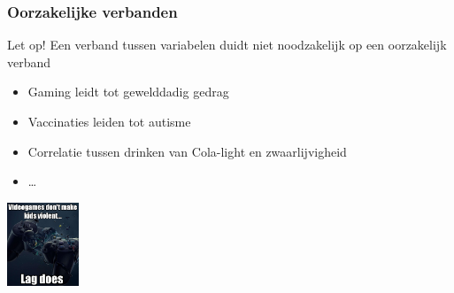 \documentclass[aspectratio=169]{beamer}
\begin{document}
\begin{frame}
  \frametitle{Oorzakelijke verbanden}

  \begin{alertblock}{Let op!}
  Een verband tussen variabelen duidt niet noodzakelijk op een oorzakelijk verband
  \end{alertblock}

  \begin{itemize}
    \item Gaming leidt tot gewelddadig gedrag
    \item Vaccinaties leiden tot autisme
    \item Correlatie tussen drinken van Cola-light en zwaarlijvigheid
    \item \ldots
  \end{itemize}

  \begin{center}
    \includegraphics[height=2.5cm]{img/les1-10}
  \end{center}
\end{frame}

\end{document}
